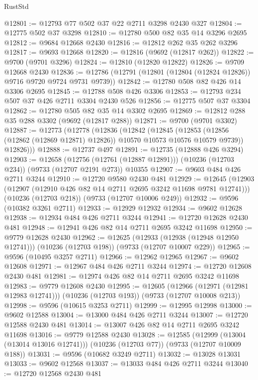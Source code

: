 \begin{lexlean}{RustStd}
\begin{coremodule}
{\begin{coremodule}
{{{{{{{{{{{{{{{{{{{{{{{{{{{{{{{{{{{{{{{{{{{{{{{{{{{{{{{@12801 := @12793 @77 @502 @37 @22 @2711 @3298 @2430 @327
@12804 := @12775 @502 @37 @3298
@12810 := @12780 @500 @82 @35 @14 @3296 @2695
@12812 := @9684 @12668 @2430
@12816 := @12812 @262 @35 @262 @3296
@12817 := @9693 @12668
@12820 := @12816 (@9692 (@12817 @262))
@12822 := @9700 (@9701 @3296)
@12824 := @12810 (@12820 @12822)
@12826 := @9709 @12668 @2430
@12836 := @12786 (@12791 (@12801 (@12804 (@12824 @12826)) @9716 @9720 @9724 @9731 @9739))
@12842 := @12780 @508 @82 @426 @14 @3306 @2695
@12845 := @12788 @508 @426 @3306
@12853 := @12793 @234 @507 @37 @426 @2711 @3304 @2430 @526
@12856 := @12775 @507 @37 @3304
@12862 := @12780 @505 @82 @35 @14 @3302 @2695
@12869 := @12812 @288 @35 @288 @3302 (@9692 (@12817 @288))
@12871 := @9700 (@9701 @3302)
@12887 := @12773
    (@12778
      (@12836
        (@12842
          (@12845
            (@12853 (@12856 (@12862 (@12869 @12871) @12826)) @10570 @10573 @10576 @10579 @9739))
          @12826)))
@12888 := @12737 @497
@12891 := @12735 (@12888 @426 @3294)
@12903 := @12658
    (@12756 (@12761 (@12887 @12891)))
    (@10236 (@12703 @234))
    (@9733 (@12707 @2191 @273))
    @10355
@12907 := @9603 @484 @426 @2711 @3244
@12910 := @12720 @9580 @2430 @481
@12929 := @12645
    (@12903 (@12907 (@12910 @426 @82 @14 @2711 @2695 @3242 @11698 @9781 @12741)))
    (@10236 (@12703 @218))
    (@9733 (@12707 @10006 @249))
@12932 := @9596 (@10382 @3261 @2711)
@12933 := @12929 @12932
@12934 := @9602 @12628
@12938 := @12934 @484 @426 @2711 @3244
@12941 := @12720 @12628 @2430 @481
@12948 := @12941 @426 @82 @14 @2711 @2695 @3242 @11698
@12950 := @9779 @12628 @2430
@12962 := @12625
    (@12933 (@12938 (@12948 @12950 @12741)))
    (@10236 (@12703 @198))
    (@9733 (@12707 @10007 @229))
@12965 := @9596 (@10495 @3257 @2711)
@12966 := @12962 @12965
@12967 := @9602 @12608
@12971 := @12967 @484 @426 @2711 @3244
@12974 := @12720 @12608 @2430 @481
@12981 := @12974 @426 @82 @14 @2711 @2695 @3242 @11698
@12983 := @9779 @12608 @2430
@12995 := @12605
    (@12966 (@12971 (@12981 @12983 @12741)))
    (@10236 (@12703 @193))
    (@9733 (@12707 @10008 @213))
@12998 := @9596 (@10615 @3253 @2711)
@12999 := @12995 @12998
@13000 := @9602 @12588
@13004 := @13000 @484 @426 @2711 @3244
@13007 := @12720 @12588 @2430 @481
@13014 := @13007 @426 @82 @14 @2711 @2695 @3242 @11698
@13016 := @9779 @12588 @2430
@13028 := @12585
    (@12999 (@13004 (@13014 @13016 @12741)))
    (@10236 (@12703 @77))
    (@9733 (@12707 @10009 @188))
@13031 := @9596 (@10682 @3249 @2711)
@13032 := @13028 @13031
@13033 := @9602 @12568
@13037 := @13033 @484 @426 @2711 @3244
@13040 := @12720 @12568 @2430 @481
}}}}}}}}}}}}}}}}}}}}}}}}}}}}}}}}}}}}}}}}}}}}}}}}}}}}}}}
\end{coremodule}}
\end{coremodule}
\end{lexlean}
